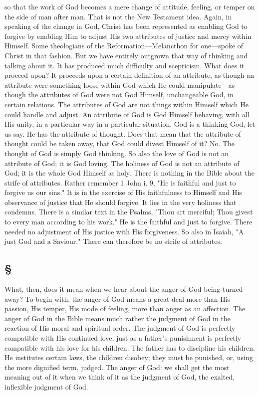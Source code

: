 \documentclass[draft]{ptfdoc}
\begin{document}
so that the work of God becomes a mere change 
of attitude, feeling, or temper on the side of man 
after man. That is not the New Testament idea. 
Again, in speaking of the change in God, Christ 
has been represented as enabling God to forgive 
by enabling Him to adjust His two attributes of 
justice and mercy within Himself. Some theologians 
of the Reformation---Melancthon for one---spoke 
of Christ in that fashion. But we have 
entirely outgrown that way of thinking and 
talking about it. It has produced much difficulty 
and scepticism. What does it proceed 
upon? It proceeds upon a certain definition 
of an attribute, as though an attribute were 
something loose within God which He could 
manipulate---as though the attributes of God 
were not God Himself, unchangeable God, in 
certain relations. The attributes of God are 
not things within Himself which He could 
handle and adjust. An attribute of God is God 
Himself behaving, with all His unity, in a particular 
way in a particular situation. God is 
a thinking God, let us say. He has the attribute 
of thought. Does that mean that the 
attribute of thought could be taken away, 
that God could divest Himself of it? No. The 
thought of God is simply God thinking. So 
also the love of God is not an attribute of 
God; it is God loving. The holiness of God 
is not an attribute of God; it is the whole 
God Himself as holy. There is nothing in the 
Bible about the strife of attributes. Rather 
remember 1 John i. 9, "He is faithful and just 
to forgive us our sins." It is in the exercise of 
His faithfulness to Himself and His observance 
of justice that He should forgive. It lies in 
the very holiness that condemns. There is a 
similar text in the Psalms, "Thou art merciful; 
Thou givest to every man according to his 
work." He is the faithful and just to forgive. 
There needed no adjustment of His justice with 
His forgiveness. So also in Isaiah, "A just God 
and a Saviour." There can therefore be no strife 
of attributes. 

\subsection*{
\S
}

What, then, does it mean when we hear about 
the anger of God being turned away? To begin 
with, the anger of God means a great deal more 
than His passion, His temper, His mode of 
feeling, more than anger as an affection. The 
anger of God in the Bible means much rather 
the judgment of God in the reaction of His 
moral and spiritual order. The judgment of God 
is perfectly compatible with His continued love, 
just as a father's punishment is perfectly compatible 
with his love for his children. The 
father has to discipline his children. He institutes 
certain laws, the children disobey; they 
must be punished, or, using the more dignified 
term, judged. The anger of God: we shall get 
the most meaning out of it when we think of it 
as the judgment of God, the exalted, inflexible 
judgment of God. 
\end{document}
